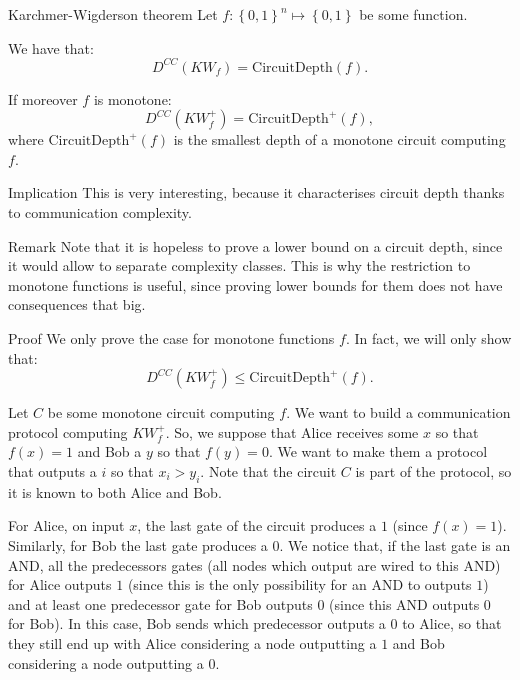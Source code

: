 \documentclass[a4paper]{article}
\begin{document}
\begin{parag}{Karchmer-Wigderson theorem}
    Let $f: \left\{0, 1\right\}^n \mapsto \left\{0, 1\right\}$ be some function.

    We have that: 
    \[D^{CC}\left(KW_f\right) = \text{CircuitDepth}\left(f\right).\] 

    If moreover $f$ is monotone: 
    \[D^{CC}\left(KW_f^+\right) = \text{CircuitDepth}^+\left(f\right),\]
    where $\text{CircuitDepth}^+\left(f\right)$ is the smallest depth of a monotone circuit computing $f$.

    \begin{subparag}{Implication}
        This is very interesting, because it characterises circuit depth thanks to communication complexity.
    \end{subparag}

    \begin{subparag}{Remark}
        Note that it is hopeless to prove a lower bound on a circuit depth, since it would allow to separate complexity classes. This is why the restriction to monotone functions is useful, since proving lower bounds for them does not have consequences that big.
    \end{subparag}

    \begin{subparag}{Proof}
        We only prove the case for monotone functions $f$. In fact, we will only show that:
        \[D^{CC}\left(KW^+_f\right) \leq \text{CircuitDepth}^+\left(f\right).\]

        Let $C$ be some monotone circuit computing $f$. We want to build a communication protocol computing $KW_f^+$. So, we suppose that Alice receives some $x$ so that $f\left(x\right) = 1$ and Bob a $y$ so that $f\left(y\right) = 0$. We want to make them a protocol that outputs a $i$ so that $x_i > y_i$. Note that the circuit $C$ is part of the protocol, so it is known to both Alice and Bob. 

        For Alice, on input $x$, the last gate of the circuit produces a $1$ (since $f\left(x\right) = 1$). Similarly, for Bob the last gate produces a $0$. We notice that, if the last gate is an AND, all the predecessors gates (all nodes which output are wired to this AND) for Alice outputs $1$ (since this is the only possibility for an AND to outputs $1$) and at least one predecessor gate for Bob outputs $0$ (since this AND outputs $0$ for Bob). In this case, Bob sends which predecessor outputs a 0 to Alice, so that they still end up with Alice considering a node outputting a $1$ and Bob considering a node outputting a $0$. 


\end{subparag}
\end{parag}
\end{document}
